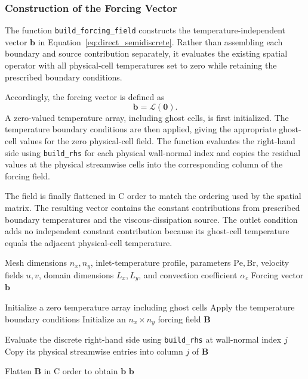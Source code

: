 \subsubsection{Construction of the Forcing Vector}

The function \texttt{build\_forcing\_field} constructs the
temperature-independent vector $\mathbf{b}$ in
Equation~\eqref{eq:direct_semidiscrete}. Rather than assembling
each boundary and source contribution separately, it evaluates
the existing spatial operator with all physical-cell
temperatures set to zero while retaining the prescribed
boundary conditions.

Accordingly, the forcing vector is defined as
\begin{equation}
\boxed{
\mathbf{b}=\mathcal{L}(\mathbf{0}).
}
\label{eq:direct_implementation_forcing}
\end{equation}
A zero-valued temperature array, including ghost cells, is
first initialized. The temperature boundary conditions are
then applied, giving the appropriate ghost-cell values for
the zero physical-cell field. The function evaluates the
right-hand side using \texttt{build\_rhs} for each physical
wall-normal index and copies the residual values at the
physical streamwise cells into the corresponding column of
the forcing field.

The field is finally flattened in C order to match the
ordering used by the spatial matrix. The resulting vector
contains the constant contributions from prescribed boundary
temperatures and the viscous-dissipation source. The outlet
condition adds no independent constant contribution because
its ghost-cell temperature equals the adjacent physical-cell
temperature.

\begin{algorithm}[H]
\caption{Construction of the Forcing Vector}
\label{alg:direct_forcing_assembly}
\begin{algorithmic}[1]
\Require Mesh dimensions $n_x,n_y$, inlet-temperature profile,
parameters $\mathrm{Pe},\mathrm{Br}$, velocity fields $u,v$,
domain dimensions $L_x,L_y$, and convection coefficient $\alpha_c$
\Ensure Forcing vector $\mathbf{b}$

\State Initialize a zero temperature array including ghost cells
\State Apply the temperature boundary conditions
\State Initialize an $n_x\times n_y$ forcing field $\mathbf{B}$

    \State Evaluate the discrete right-hand side using
    \texttt{build\_rhs} at wall-normal index $j$
    \State Copy its physical streamwise entries into
    column $j$ of $\mathbf{B}$
\EndFor

\State Flatten $\mathbf{B}$ in C order to obtain $\mathbf{b}$
\State \Return $\mathbf{b}$
\end{algorithmic}
\end{algorithm}

